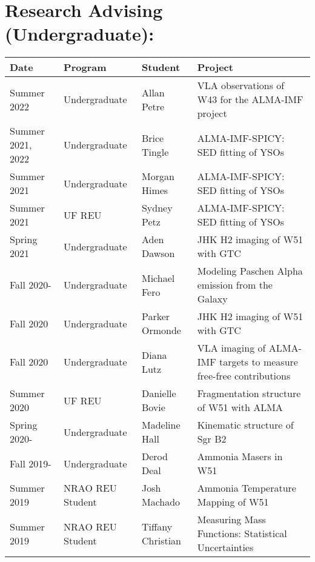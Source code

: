 \begin{minipage}{\textwidth}
\section*{Research Advising (Undergraduate): }
\vspace{-12pt}
\begin{tabular}{p{0.85in}p{1.3in}lp{2.6in}}
    Date  & Program & Student &  Project \\
    \hline
    Summer 2022 & Undergraduate &                               Allan Petre    &  VLA observations of W43 for the ALMA-IMF project \\
    Summer 2021, 2022 & Undergraduate &                         Brice Tingle    &  ALMA-IMF-SPICY: SED fitting of YSOs \\
    Summer 2021 & Undergraduate &                               Morgan Himes    &  ALMA-IMF-SPICY: SED fitting of YSOs \\
    Summer 2021 & UF REU &                                      Sydney Petz    &  ALMA-IMF-SPICY: SED fitting of YSOs \\
    Spring 2021 & Undergraduate &                               Aden Dawson    &  JHK H2 imaging of W51 with GTC \\
    Fall 2020- & Undergraduate &                               Michael Fero    &  Modeling Paschen Alpha emission from the Galaxy \\
    Fall 2020 & Undergraduate &                               Parker Ormonde    &  JHK H2 imaging of W51 with GTC \\
    Fall 2020 & Undergraduate &                               Diana Lutz    &  VLA imaging of ALMA-IMF targets to measure free-free contributions \\
    Summer 2020 & UF REU &                               Danielle Bovie    &  Fragmentation structure of W51 with ALMA \\
    Spring 2020- & Undergraduate &                               Madeline Hall    &  Kinematic structure of Sgr B2 \\
    Fall 2019- & Undergraduate &                               Derod Deal    &  Ammonia Masers in W51 \\
    Summer 2019 & NRAO REU Student &                                              Josh Machado    &  Ammonia Temperature Mapping of W51 \\
    Summer 2019 & NRAO REU Student &                                              Tiffany Christian    &  Measuring Mass Functions: Statistical Uncertainties \\

\end{tabular}
\end{minipage}
